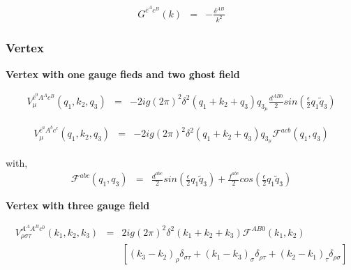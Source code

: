 \documentclass[a4paper,11pt]{article} %
\theoremstyle{plain}
\theoremstyle{definition}
\theoremstyle{remark}
\numberwithin{equation}{section}
\numberwithin{equation}{subsection}
\numberwithin{figure}{section}
\begin{document}
\begin{eqnarray*}
 G^{ \overline{c}^{A} c^{B} } (k)  &=& - \frac{ \delta^{AB} }{ k^2 } 
\end{eqnarray*}

\subsubsection{Vertex}

\textbf{Vertex with one gauge fieds and two ghost field}


\begin{eqnarray*}
 V_{\mu}^{ \overline{c}^{0} A^{A} c^{B} } (q_1 , k_2 , q_3 ) &=& 
 -2ig (2 \pi)^2 \delta^{2} ( q_1 +k_2 +q_3 ) q_{3_{\mu}} \frac{d^{AB0}}{2} sin( \frac{\epsilon}{2}  q_1 \tilde{q}_3 ) 
\end{eqnarray*}



\begin{eqnarray*}
 V_{\mu}^{ \overline{c}^{a} A^{b} c^{c} } (q_1 , k_2 , q_3 ) &=& 
 -2ig (2 \pi)^2 \delta^{2} ( q_1 +k_2 +q_3 ) q_{3_{\mu}} \mathcal{F}^{acb}(q_1 , q_3)
\end{eqnarray*}

\noindent
with,
\begin{eqnarray*}
 \mathcal{F}^{abc}(q_1 , q_3)  &=&  \frac{d^{abc}}{2}   sin \left(  \frac{\epsilon}{2}  q_1  \tilde{q}_3  \right)   
 +    \frac{f^{abc}}{2}   cos \left(  \frac{\epsilon}{2}  q_1  \tilde{q}_3   \right)
\end{eqnarray*}

\textbf{Vertex with three gauge field}


\begin{eqnarray*}
 V_{\rho  \sigma  \tau}^{ A^{A} A^{B} c^{0} } (k_1 , k_2 , k_3 ) &=&  2ig (2 \pi)^2 \delta^{2} ( k_1 + k_2 + k_3 )  \mathcal{F}^{AB0}(k_1 , k_2) 
 \nonumber \\
&&   \left[
(k_3  -  k_2)_{\rho}  \delta_{\sigma  \tau}  +  (k_1  -  k_3)_{\sigma}  \delta_{\rho  \tau}  +  (k_2  -  k_1)_{\tau}  \delta_{\rho  \sigma }
\right]     
\end{eqnarray*}
\end{document}

